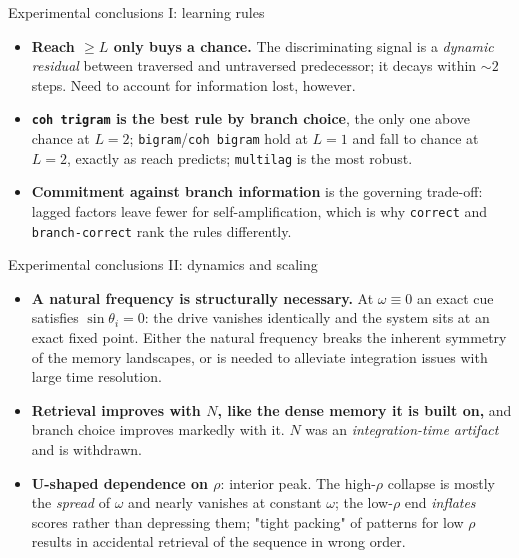 \documentclass[aspectratio=169]{beamer}
\newcommand{\thetavar}{\theta}
\begin{document}
\begin{frame}{Experimental conclusions I: learning rules}
  \begin{itemize}\small
    \item \textbf{Reach $\ge L$ only buys a chance.} The discriminating signal is a
      \emph{dynamic residual} between traversed and untraversed predecessor; it decays within
      $\sim 2$ steps. Need to account for information lost, however.
    \item \textbf{\texttt{coh trigram} is the best rule by branch choice}, the only one above
      chance at $L = 2$; \texttt{bigram}/\texttt{coh bigram} hold at $L = 1$ and fall to chance
      at $L = 2$, exactly as reach predicts; \texttt{multilag} is the most robust.
    \item \textbf{Commitment against branch information} is the governing trade-off: lagged
      factors leave fewer for self-amplification, which is why \texttt{correct} and
      \texttt{branch-correct} rank the rules differently.

  \end{itemize}
\end{frame}

\begin{frame}{Experimental conclusions II: dynamics and scaling}
  \begin{itemize}\small
    \item \textbf{A natural frequency is structurally necessary.} At $\omega \equiv 0$ an exact
      cue satisfies $\sin\thetavar_i = 0$: the drive vanishes identically and the system sits at
      an exact fixed point. Either the natural frequency breaks the inherent symmetry of the memory landscapes, or is needed to alleviate integration issues with large time resolution.
    \item \textbf{Retrieval improves with $N$, like the dense memory it is built on,} and
      branch choice improves markedly with it.
      $N$ was an \emph{integration-time artifact} and is withdrawn.
    \item \textbf{U-shaped dependence on $\rho$}: interior peak. The
      high-$\rho$ collapse is mostly the \emph{spread} of $\omega$ and nearly vanishes at
      constant $\omega$; the low-$\rho$ end \emph{inflates} scores rather than depressing them; "tight packing" of patterns for low $\rho$ results in accidental retrieval of the sequence in wrong order.
   
 
  \end{itemize}
\end{frame}
\end{document}
